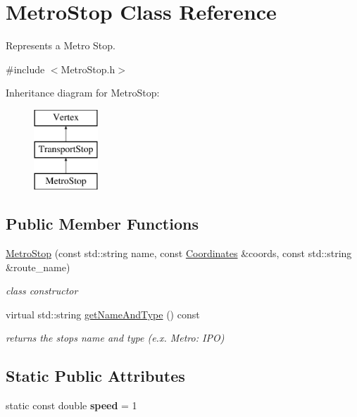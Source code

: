 \hypertarget{class_metro_stop}{}\section{Metro\+Stop Class Reference}
\label{class_metro_stop}


Represents a Metro Stop.  




{\ttfamily \#include $<$Metro\+Stop.\+h$>$}

Inheritance diagram for Metro\+Stop\+:\begin{figure}[H]
\begin{center}
\leavevmode
\includegraphics[height=3.000000cm]{class_metro_stop}
\end{center}
\end{figure}
\subsection*{Public Member Functions}
\begin{DoxyCompactItemize}
\item 
\hyperlink{class_metro_stop_a704608563c82fbd737f03df09f9b5fa9}{Metro\+Stop} (const std\+::string name, const \hyperlink{class_coordinates}{Coordinates} \&coords, const std\+::string \&route\+\_\+name)
\begin{DoxyCompactList}\small\item\em class constructor \end{DoxyCompactList}\item 
virtual std\+::string \hyperlink{class_metro_stop_ab2805dfc9f452e981ca71028c64cef38}{get\+Name\+And\+Type} () const 
\begin{DoxyCompactList}\small\item\em returns the stop\textquotesingle{}s name and type (e.\+x. Metro\+: I\+P\+O) \end{DoxyCompactList}\end{DoxyCompactItemize}
\subsection*{Static Public Attributes}
\begin{DoxyCompactItemize}
\item 
\hypertarget{class_metro_stop_a1d90f089b3625a13fce91942cdc99d50}{}static const double {\bfseries speed} = 1\label{class_metro_stop_a1d90f089b3625a13fce91942cdc99d50}

\end{DoxyCompactItemize}
